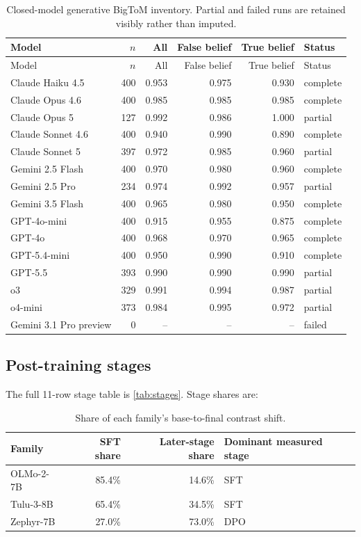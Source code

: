 \begin{longtable}{@{}lrrrrl@{}}
\caption{Closed-model generative BigToM inventory. Partial and failed runs are retained visibly rather than imputed.}\label{tab:closed-bigtom}\\
\toprule
Model & $n$ & All & False belief & True belief & Status \\
\midrule
\endfirsthead
\toprule
Model & $n$ & All & False belief & True belief & Status \\
\midrule
\endhead
Claude Haiku 4.5 & 400 & 0.953 & 0.975 & 0.930 & complete \\
Claude Opus 4.6 & 400 & 0.985 & 0.985 & 0.985 & complete \\
Claude Opus 5 & 127 & 0.992 & 0.986 & 1.000 & partial \\
Claude Sonnet 4.6 & 400 & 0.940 & 0.990 & 0.890 & complete \\
Claude Sonnet 5 & 397 & 0.972 & 0.985 & 0.960 & partial \\
Gemini 2.5 Flash & 400 & 0.970 & 0.980 & 0.960 & complete \\
Gemini 2.5 Pro & 234 & 0.974 & 0.992 & 0.957 & partial \\
Gemini 3.5 Flash & 400 & 0.965 & 0.980 & 0.950 & complete \\
GPT-4o-mini & 400 & 0.915 & 0.955 & 0.875 & complete \\
GPT-4o & 400 & 0.968 & 0.970 & 0.965 & complete \\
GPT-5.4-mini & 400 & 0.950 & 0.990 & 0.910 & complete \\
GPT-5.5 & 393 & 0.990 & 0.990 & 0.990 & partial \\
o3 & 329 & 0.991 & 0.994 & 0.987 & partial \\
o4-mini & 373 & 0.984 & 0.995 & 0.972 & partial \\
Gemini 3.1 Pro preview & 0 & -- & -- & -- & failed \\
\bottomrule
\end{longtable}

\subsection{Post-training stages}

The full 11-row stage table is \cref{tab:stages}.
Stage shares are:
\begin{table}[h]
\centering
\small
\caption{Share of each family's base-to-final contrast shift.}
\label{tab:stage-shares}
\begin{tabular}{@{}lrrl@{}}
\toprule
Family & SFT share & Later-stage share & Dominant measured stage \\
\midrule
OLMo-2-7B & 85.4\% & 14.6\% & SFT \\
Tulu-3-8B & 65.4\% & 34.5\% & SFT \\
Zephyr-7B & 27.0\% & 73.0\% & DPO \\
\bottomrule
\end{tabular}
\end{table}


